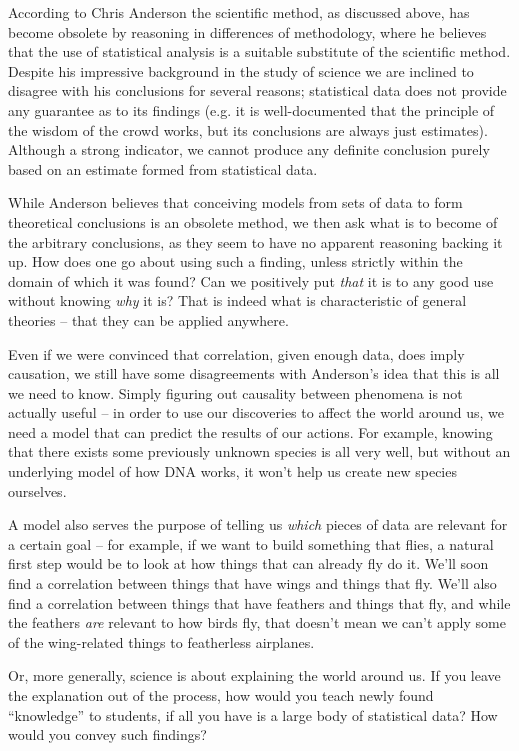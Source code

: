\documentclass[11pt,a4paper]{article}
\begin{document}
According to Chris Anderson the scientific method, as discussed above, has become obsolete by reasoning in differences of methodology, where he believes that the use of statistical analysis is a suitable substitute of the scientific method. Despite his impressive background in the study of science we are inclined to disagree with his conclusions for several reasons; statistical data does not provide any guarantee as to its findings (e.g. it is well-documented that the principle of the wisdom of the crowd works, but its conclusions are always just estimates). Although a strong indicator, we cannot produce any definite conclusion purely based on an estimate formed from statistical data.

While Anderson believes that conceiving models from sets of data to form theoretical conclusions is an obsolete method, we then ask what is to become of the arbitrary conclusions, as they seem to have no apparent reasoning backing it up. How does one go about using such a finding, unless strictly within the domain of which it was found? Can we positively put \emph{that} it is to any good use without knowing \emph{why} it is? That is indeed what is characteristic of general theories -- that they can be applied anywhere.

Even if we were convinced that correlation, given enough data, does imply causation, we still have some disagreements with Anderson's idea that this is all we need to know. Simply figuring out causality between phenomena is not actually useful -- in order to use our discoveries to affect the world around us, we need a model that can predict the results of our actions. For example, knowing that there exists some previously unknown species\cite{anderson08} is all very well, but without an underlying model of how DNA works, it won’t help us create new species ourselves.

A model also serves the purpose of telling us \emph{which} pieces of data are relevant for a certain goal -- for example, if we want to build something that flies, a natural first step would be to look at how things that can already fly do it. We’ll soon find a correlation between things that have wings and things that fly. We’ll also find a correlation between things that have feathers and things that fly, and while the feathers \emph{are} relevant to how birds fly, that doesn’t mean we can't apply some of the wing-related things to featherless airplanes.

Or, more generally, science is about explaining the world around us. If you leave the explanation out of the process, how would you teach newly found ``knowledge'' to students, if all you have is a large body of statistical data? How would you convey such findings?
\end{document}
